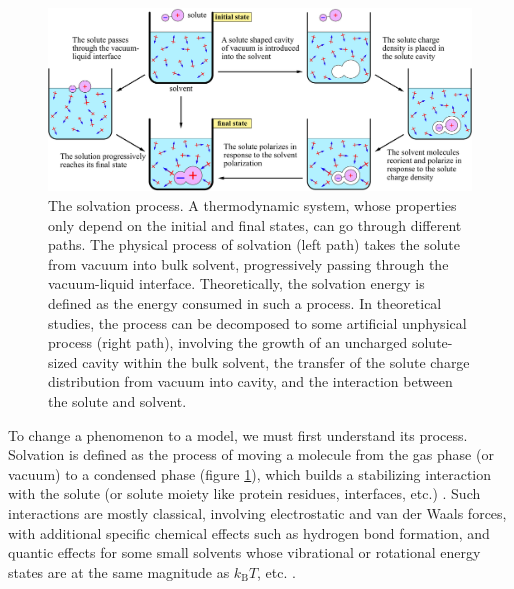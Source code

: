 \begin{figure}[h]
\centering{}\textcolor{red}{}%
\begin{minipage}[t]{1\textwidth}%
\begin{center}
\includegraphics[width=1\columnwidth]{_figure/solvation}\caption[The solvation process]{The solvation process.\label{fig:Process-of-solvation} A thermodynamic
system, whose properties only depend on the initial and final states,
can go through different paths. The physical process of solvation
(left path) takes the solute from vacuum into bulk solvent, progressively
passing through the vacuum-liquid interface. Theoretically, the solvation
energy is defined as the energy consumed in such a process. In theoretical
studies, the process can be decomposed to some artificial unphysical
process (right path), involving the growth of an uncharged solute-sized
cavity within the bulk solvent, the transfer of the solute charge
distribution from vacuum into cavity, and the interaction between
the solute and solvent.}

\par\end{center}%
\end{minipage}
\end{figure}


To change a phenomenon to a model, we must first understand its process.
Solvation is defined as the process of moving a molecule from the
gas phase (or vacuum) to a condensed phase (figure \ref{fig:Process-of-solvation}),
which builds a stabilizing interaction with the solute (or solute
moiety like protein residues, interfaces, etc.) \citep{iupac}. Such
interactions are mostly classical, involving electrostatic
and van der Waals forces, with additional specific chemical effects
such as hydrogen bond formation, and quantic effects for some small
solvents whose vibrational or rotational energy states are at the same
magnitude as $k_{\mathrm{B}}T$, etc. \citep{Gray-Gubbins}.

